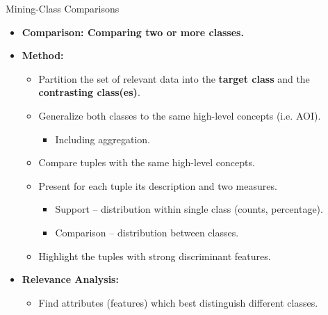 \begin{frame}{Mining-Class Comparisons}
  \begin{itemize}
  \item \textbf{Comparison: Comparing two or more classes.}
  \item \textbf{Method:}
    \begin{itemize}
    \item Partition the set of relevant data into the \textbf{\color{airforceblue}target class} and the \textbf{\color{airforceblue}contrasting class(es)}.
    \item Generalize both classes to the same high-level concepts (i.e. AOI).
      \begin{itemize}
      \item Including aggregation.
      \end{itemize}
    \item Compare tuples with the same high-level concepts.
    \item Present for each tuple its description and two measures.
      \begin{itemize}
      \item Support -- distribution within single class (counts, percentage).
      \item Comparison -- distribution between classes.
      \end{itemize}
    \item Highlight the tuples with strong discriminant features.
    \end{itemize}
  \item \textbf{Relevance Analysis:}
    \begin{itemize}
    \item Find attributes (features) which best distinguish different classes.
    \end{itemize}
  \end{itemize}
\end{frame}

